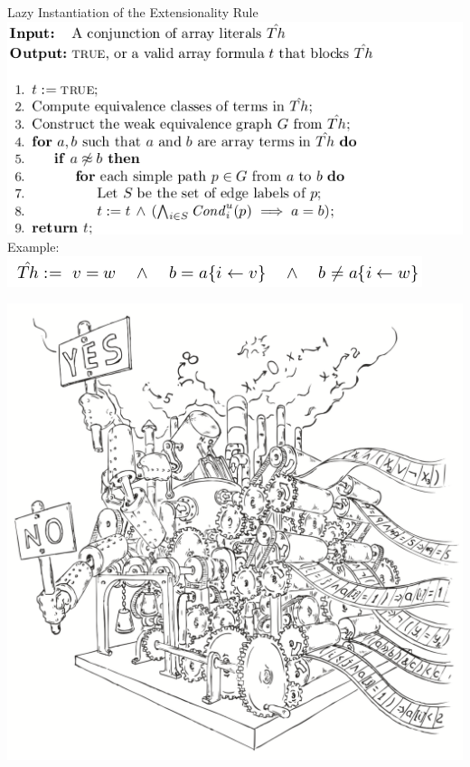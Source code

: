 \documentclass{beamer}
\begin{document}
\begin{frame}{Lazy Instantiation of the Extensionality Rule}
\includegraphics[scale=0.5]{extensional-array-encoding.png}\newline
Example:\newline
\includegraphics[scale=0.5]{ex3.png}\newline
\end{frame}

\begin{frame}
\includegraphics[scale=0.5]{../decision-procedure.png}
\end{frame}
\end{document}
